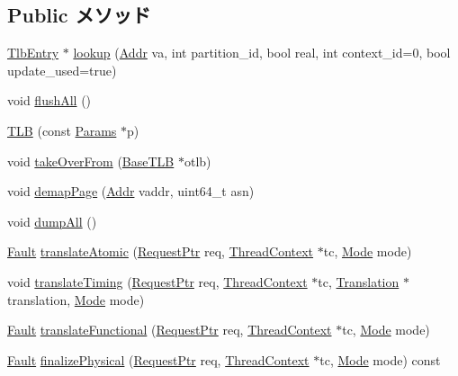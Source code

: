\subsection*{Public メソッド}
\begin{DoxyCompactItemize}
\item 
\hyperlink{structSparcISA_1_1TlbEntry}{TlbEntry} $\ast$ \hyperlink{classSparcISA_1_1TLB_a74fbbb81cfaa89e81165a62736e4311a}{lookup} (\hyperlink{base_2types_8hh_af1bb03d6a4ee096394a6749f0a169232}{Addr} va, int partition\_\-id, bool real, int context\_\-id=0, bool update\_\-used=true)
\item 
void \hyperlink{classSparcISA_1_1TLB_aca1483a67aee5a91e442f7131d66bcbd}{flushAll} ()
\item 
\hyperlink{classSparcISA_1_1TLB_acb886bd3c59f00c21be9ceaaf25dab97}{TLB} (const \hyperlink{classSparcISA_1_1TLB_a3073524452e67556982db4c27c5f18ea}{Params} $\ast$p)
\item 
void \hyperlink{classSparcISA_1_1TLB_a15b6c15c1be2ca4de3e65772a02aa29f}{takeOverFrom} (\hyperlink{classBaseTLB}{BaseTLB} $\ast$otlb)
\item 
void \hyperlink{classSparcISA_1_1TLB_a2d698ff909513b48a1263f8a5440e067}{demapPage} (\hyperlink{base_2types_8hh_af1bb03d6a4ee096394a6749f0a169232}{Addr} vaddr, uint64\_\-t asn)
\item 
void \hyperlink{classSparcISA_1_1TLB_a8cb66fc5f158a5d28cb9e5d73ecd26cc}{dumpAll} ()
\item 
\hyperlink{classRefCountingPtr}{Fault} \hyperlink{classSparcISA_1_1TLB_ad54e01e3c0a1613098a76b7f92e5be93}{translateAtomic} (\hyperlink{classRequest}{RequestPtr} req, \hyperlink{classThreadContext}{ThreadContext} $\ast$tc, \hyperlink{classBaseTLB_a46c8a310cf4c094f8c80e1cb8dc1f911}{Mode} mode)
\item 
void \hyperlink{classSparcISA_1_1TLB_ae52f7e465748883695d2b4f432a13652}{translateTiming} (\hyperlink{classRequest}{RequestPtr} req, \hyperlink{classThreadContext}{ThreadContext} $\ast$tc, \hyperlink{classBaseTLB_1_1Translation}{Translation} $\ast$translation, \hyperlink{classBaseTLB_a46c8a310cf4c094f8c80e1cb8dc1f911}{Mode} mode)
\item 
\hyperlink{classRefCountingPtr}{Fault} \hyperlink{classSparcISA_1_1TLB_a26658814c6c9034665aae19cf25545bb}{translateFunctional} (\hyperlink{classRequest}{RequestPtr} req, \hyperlink{classThreadContext}{ThreadContext} $\ast$tc, \hyperlink{classBaseTLB_a46c8a310cf4c094f8c80e1cb8dc1f911}{Mode} mode)
\item 
\hyperlink{classRefCountingPtr}{Fault} \hyperlink{classSparcISA_1_1TLB_ae199d95c42e036851a8a0543c6d6d2e3}{finalizePhysical} (\hyperlink{classRequest}{RequestPtr} req, \hyperlink{classThreadContext}{ThreadContext} $\ast$tc, \hyperlink{classBaseTLB_a46c8a310cf4c094f8c80e1cb8dc1f911}{Mode} mode) const 

\end{DoxyCompactItemize}
